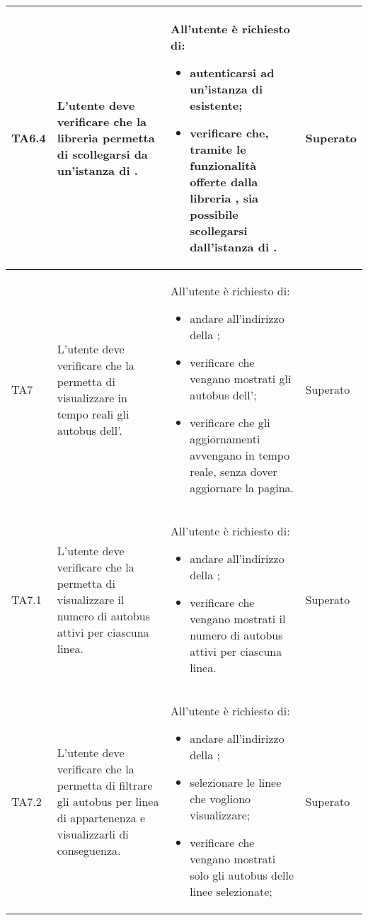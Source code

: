 \begin{longtabu}{| X[0.5] | X | X | X[0.5] |}
	TA6.4 & L'utente  deve verificare che la libreria  permetta di scollegarsi da un'istanza di \projectname{}.

		& All'utente  è richiesto di:
		\begin{itemize}
			\item autenticarsi ad un'istanza di \projectname{} esistente;
			\item verificare che, tramite le funzionalità offerte dalla libreria , sia possibile scollegarsi dall'istanza di \projectname{}.
		\end{itemize}
& Superato \\ \hline

	TA7 & L'utente deve verificare che la  permetta di visualizzare in tempo reali gli autobus dell'.

		& All'utente è richiesto di:
		\begin{itemize}
			\item andare all'indirizzo della ;
			\item verificare che vengano mostrati gli autobus dell';
			\item verificare che gli aggiornamenti avvengano in tempo reale, senza dover aggiornare la pagina.
		\end{itemize}
& Superato \\ \hline

	TA7.1 & L'utente deve verificare che la  permetta di visualizzare il numero di autobus attivi per ciascuna linea.

		& All'utente è richiesto di:
		\begin{itemize}
			\item andare all'indirizzo della ;
			\item verificare che vengano mostrati il numero di autobus attivi per ciascuna linea.
		\end{itemize}
& Superato \\ \hline

	TA7.2 & L'utente deve verificare che la  permetta di filtrare gli autobus per linea di appartenenza e visualizzarli di conseguenza.

		& All'utente è richiesto di:
		\begin{itemize}
			\item andare all'indirizzo della ;
			\item selezionare le linee che vogliono visualizzare;
			\item verificare che vengano mostrati solo gli autobus delle linee selezionate;
		\end{itemize}
& Superato \\ \hline


\end{longtabu}
